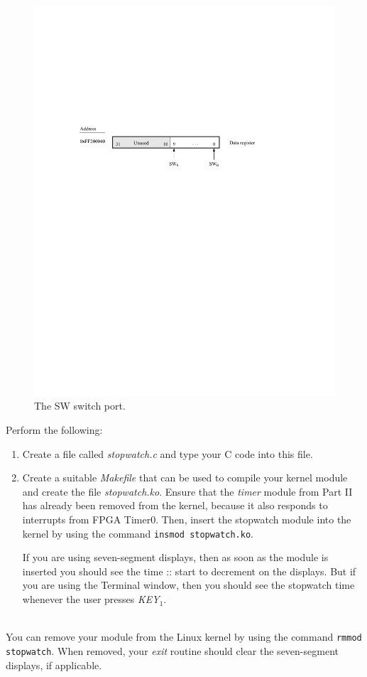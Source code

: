 \documentclass[epsfig,10pt,fullpage]{article}
\newcommand{\CommonDocsPath}{../../common/docs}
\begin{document}
\begin{figure}[H]
   \begin{center}
       \includegraphics{figures/fig_slider_port.pdf}
   \end{center}
	\caption{The SW switch port.}
\label{fig:slider}
\end{figure}

\noindent
Perform the following:

\begin{enumerate}
\item Create a file called {\it stopwatch.c} and type your C code into this file.

\item
Create a suitable {\it Makefile} that can be used to compile your kernel module and create the 
file {\it stopwatch.ko}. Ensure that the {\it timer} module from Part II has already been 
removed from the kernel, because it also responds to interrupts from FPGA Timer0. Then, 
insert the stopwatch module into the kernel by using the 
command \texttt{insmod stopwatch.ko}. 

If you are using seven-segment displays, then as soon as the module is inserted you should 
see the time :: start to decrement on the displays. But if you are
using the Terminal window, then you should see the stopwatch time whenever the user presses
{\it KEY}$_1$.
\end{enumerate}

~\\
\noindent
You can remove your module from the Linux kernel by using the command 
\texttt{rmmod stopwatch}. When removed, your {\it exit} routine should clear the seven-segment
displays, if applicable.


\end{document}
